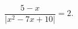 \begin{ex}[type=equation]
	\begin{condition}
		$\dfrac{5 - x}{\big|x^2 - 7x + 10\big|}= 2.$
	\end{condition}
\end{ex}